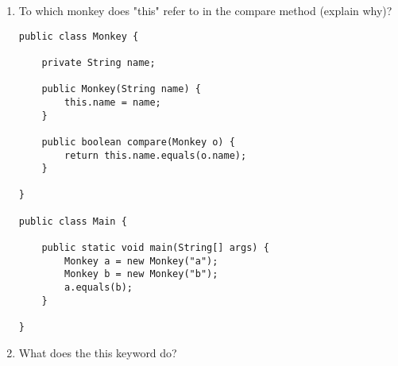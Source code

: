 \documentclass[12pt,letterpaper]{article}
\begin{document}
\begin{enumerate}
\newpage

\item
To which monkey does "this" refer to in the compare method (explain why)?
\begin{lstlisting}
public class Monkey {

    private String name;

    public Monkey(String name) {
        this.name = name;
    }

    public boolean compare(Monkey o) {
        return this.name.equals(o.name);
    }

}

public class Main {

    public static void main(String[] args) {
        Monkey a = new Monkey("a");
        Monkey b = new Monkey("b");
        a.equals(b);
    }

}
\end{lstlisting}

\item
What does the this keyword do?

\end{enumerate}
\end{document}
